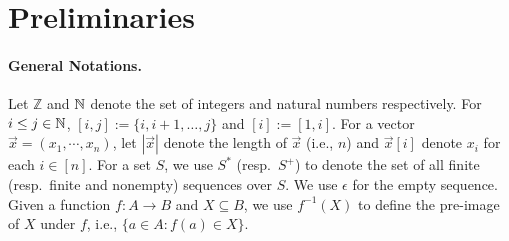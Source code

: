 
\section{Preliminaries}
\label{sec:prelim}


\paragraph{General Notations.}
Let $\mathbb{Z}$ and $\mathbb{N}$ denote the set of integers and natural numbers
respectively. For $i \le j \in \mathbb{N}$, $[i, j]:=\{i,i+1,\ldots,j\}$ and
$[i] := [1, i]$. 
For a vector
$\vec{x}=(x_1,\cdots, x_n)$, let $|\vec{x}|$ denote the length of $\vec{x}$
(i.e., $n$) and  $\vec{x}[i]$ denote $x_i$ for each $i \in [n]$. For a set
$S$, we use $S^*$ (resp.~$S^+$) to denote the set of all finite (resp.~finite
and nonempty) sequences over $S$. We use $\epsilon$ for the empty sequence.
Given a function $f: A \to B$ and $X \subseteq B$, we use $f^{-1}(X)$ to
define the pre-image of $X$ under $f$, i.e., $\{ a \in A: f(a) \in X \}$.

